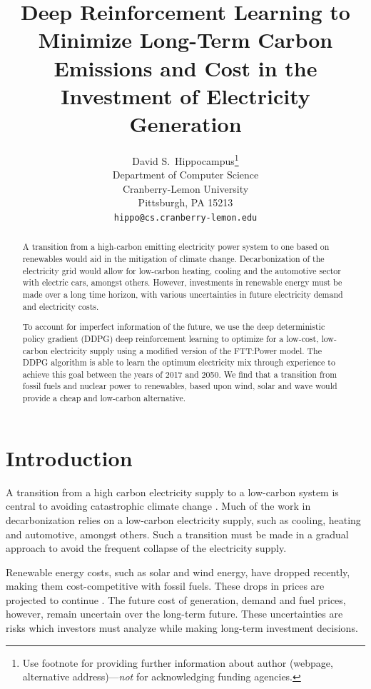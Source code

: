 \documentclass{article}
\title{Deep Reinforcement Learning to Minimize Long-Term Carbon Emissions and Cost in the Investment of Electricity Generation}
\author{%
  David S.~Hippocampus\thanks{Use footnote for providing further information
    about author (webpage, alternative address)---\emph{not} for acknowledging
    funding agencies.} \\
  Department of Computer Science\\
  Cranberry-Lemon University\\
  Pittsburgh, PA 15213 \\
  \texttt{hippo@cs.cranberry-lemon.edu} \\
}
\begin{document}
\maketitle

\begin{abstract}

A transition from a high-carbon emitting electricity power system to one based on renewables would aid in the mitigation of climate change. Decarbonization of the electricity grid would allow for low-carbon heating, cooling and the automotive sector with electric cars, amongst others. However, investments in renewable energy must be made over a long time horizon, with various uncertainties in future electricity demand and electricity costs. 

To account for imperfect information of the future, we use the deep deterministic policy gradient (DDPG) deep reinforcement learning to optimize for a low-cost, low-carbon electricity supply using a modified version of the FTT:Power model. The DDPG algorithm is able to learn the optimum electricity mix through experience to achieve this goal between the years of 2017 and 2050. We find that a transition from fossil fuels and nuclear power to renewables, based upon wind, solar and wave would provide a cheap and low-carbon alternative.

\end{abstract}




\section{Introduction}
\label{sec:intro}


A transition from a high carbon electricity supply to a low-carbon system is central to avoiding catastrophic climate change \cite{Kell2020}. Much of the work in decarbonization relies on a low-carbon electricity supply, such as cooling, heating and automotive, amongst others. Such a transition must be made in a gradual approach to avoid the frequent collapse of the electricity supply.

Renewable energy costs, such as solar and wind energy, have dropped recently, making them cost-competitive with fossil fuels. These drops in prices are projected to continue \cite{IEA2015}. The future cost of generation, demand and fuel prices, however, remain uncertain over the long-term future. These uncertainties are risks which investors must analyze while making long-term investment decisions.
\end{document}

